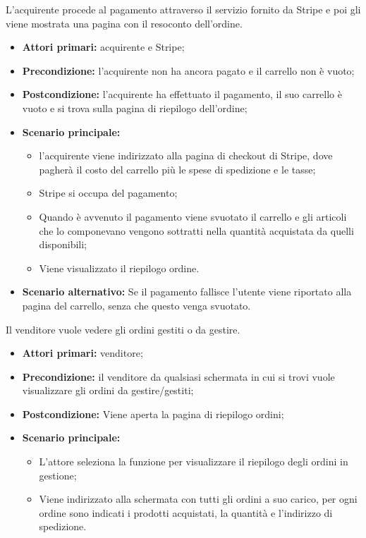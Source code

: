 L'acquirente procede al pagamento attraverso il servizio fornito da Stripe e poi gli viene mostrata una pagina con il resoconto dell'ordine.
\begin{itemize}
    \item \textbf{Attori primari:} acquirente e Stripe;
    \item \textbf{Precondizione:} l'acquirente non ha ancora pagato e il carrello non è vuoto;
    \item \textbf{Postcondizione:} l'acquirente ha effettuato il pagamento, il suo carrello è vuoto e si trova sulla pagina di riepilogo dell'ordine;
    \item \textbf{Scenario principale:}
        \begin{itemize}
            \item l'acquirente viene indirizzato alla pagina di checkout di Stripe, dove pagherà il costo del carrello più le spese di spedizione e le tasse;
            \item Stripe si occupa del pagamento;
            \item Quando è avvenuto il pagamento viene svuotato il carrello e gli articoli che lo componevano vengono sottratti nella quantità acquistata da quelli disponibili;
            \item Viene visualizzato il riepilogo ordine.
        \end{itemize}
    \item \textbf{Scenario alternativo:} Se il pagamento fallisce l'utente viene riportato alla pagina del carrello, senza che questo venga svuotato.
\end{itemize}


Il venditore vuole vedere gli ordini gestiti o da gestire.
\begin{itemize}
    \item \textbf{Attori primari:} venditore;
    \item \textbf{Precondizione:} il venditore da qualsiasi schermata in cui si trovi vuole visualizzare gli ordini da gestire/gestiti;
    \item \textbf{Postcondizione:} Viene aperta la pagina di riepilogo ordini;
    \item \textbf{Scenario principale:}
    \begin{itemize}
        \item L'attore seleziona la funzione per visualizzare il riepilogo degli ordini in gestione;
        \item Viene indirizzato alla schermata con tutti gli ordini a suo carico, per ogni ordine sono indicati i prodotti acquistati, la quantità e l'indirizzo di spedizione.
    \end{itemize}
\end{itemize}
